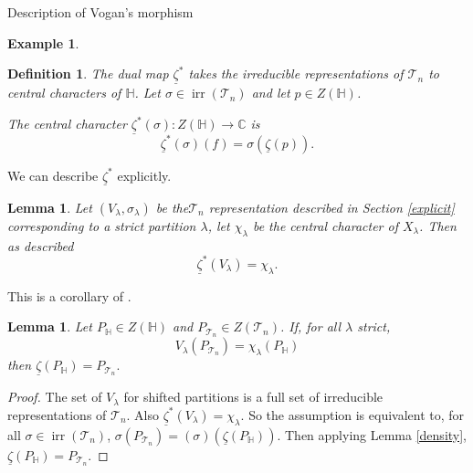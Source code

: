 \documentclass[a4paper,10pt]{amsart}
\newtheorem{definition}[theorem]{Definition}
\newtheorem{example}[theorem]{Example}
\newtheorem{lemma}[theorem]{Lemma}
\DeclareMathOperator{\irr}{irr}
\begin{document}
\begin{section}{Description of Vogan's morphism}
\begin{example}
 
 
 \centering
\end{example}


\begin{definition} The dual map $\underline{\zeta}^*$ takes the irreducible representations of $\mathcal{T}_n$ to central characters of $\mathbb{H}$. 
Let $\sigma \in \irr(\mathcal{T}_n)$ and let $p \in Z(\mathbb{H})$. 

The central character $\underline{\zeta}^* (\sigma): Z(\mathbb{H}) \to \mathbb{C}$ is
$$ \underline{\zeta}^*(\sigma)(f) = \sigma(\underline{\zeta}(p)).$$
\end{definition}

We can describe $\underline{\zeta}^*$ explicitly.
\begin{lemma} Let $(V_\lambda,\sigma_\lambda)$ be the$\mathcal{T}_n$ representation described in Section \ref{explicit} corresponding to a strict partition $\lambda$, let $\chi_\lambda$ be the central character of $X_\lambda$.
Then as described $$\underline{\zeta}^* (V_\lambda) = \chi_\lambda.$$
\end{lemma}
This is a corollary of \cite[4.4]{BCT12}.


\begin{lemma}\label{equivalent}  Let $P_{\mathbb{H}} \in Z(\mathbb{H})$ and $P_{\mathcal{T}_n} \in Z(\mathcal{T}_n)$. 
If, for all $\lambda$ strict,
$$V_\lambda(P_{\mathcal{T}_n}) = \chi_\lambda(P_\mathbb{H})$$
then $\underline{\zeta}(P_\mathbb{H}) = P_{\mathcal{T}_n}.$
\end{lemma} 


\begin{proof}


The set of $V_\lambda$ for shifted partitions is a full set of irreducible representations of $\mathcal{T}_n$. Also $\underline{\zeta}^*(V_\lambda) = \chi_\lambda$. So the assumption is equivalent to, for all $\sigma \in \irr(\mathcal{T}_n)$, $\sigma(P_{\mathcal{T}_n}) =(\sigma)(\underline{\zeta}(P_{\mathbb{H}})).$ Then applying Lemma \ref{density},
$\underline{\zeta}(P_{\mathbb{H}}) = P_{\mathcal{T}_n}$.


\end{proof}
\end{section}
\end{document}
